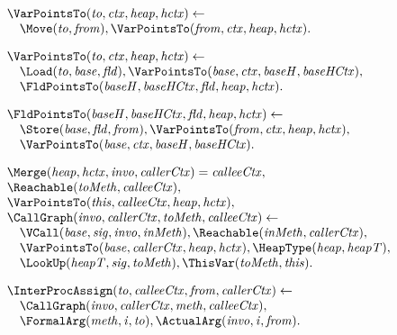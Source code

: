 {\begin{figure}[t]
\[\begin{array}{l}
  \VarPointsTo({\it to}, {\it ctx}, {\it heap}, {\it hctx}) \leftarrow \\
   \quad \Move({\it to}, {\it from}),
    \VarPointsTo({\it from}, {\it ctx},{\it heap},{\it hctx}). \\[1em]

  \VarPointsTo({\it to}, {\it ctx}, {\it heap}, {\it hctx}) \leftarrow\\
  \quad \Load({\it to}, {\it base}, {\it fld}), \VarPointsTo({\it base}, {\it ctx}, {\it baseH}, {\it baseHCtx}), \\
  \quad \FldPointsTo({\it baseH}, {\it baseHCtx}, {\it fld}, {\it heap},
   {\it hctx}). \\[1em]


  \FldPointsTo({\it baseH}, {\it baseHCtx}, {\it fld},
   {\it heap}, {\it hctx}) \leftarrow \\
  \quad \Store({\it base}, {\it fld}, {\it from}),
  \VarPointsTo({\it from}, {\it ctx}, {\it heap}, {\it hctx}), \\
    \quad \VarPointsTo({\it base}, {\it ctx}, {\it baseH}, {\it baseHCtx}).\\[1em]

  \Merge ({\it heap}, {\it hctx}, {\it invo}, {\it callerCtx}) = {\it calleeCtx}, \\
  \Reachable ({\it toMeth}, {\it calleeCtx}), \\
  \VarPointsTo ({\it this}, {\it calleeCtx}, {\it heap}, {\it hctx}), \\
  \CallGraph ({\it invo}, {\it callerCtx}, {\it toMeth}, {\it calleeCtx})
  \leftarrow \\
    \quad \VCall ({\it base}, {\it sig}, {\it invo}, {\it inMeth}), 
     \Reachable ({\it inMeth}, {\it callerCtx}), \\
   \quad \VarPointsTo ({\it base}, {\it callerCtx}, {\it heap}, {\it hctx}), 
  \HeapType({\it heap}, {\it heapT}), \\
  \quad \LookUp ({\it heapT}, {\it sig}, {\it toMeth}),
  \ThisVar ({\it toMeth}, {\it this}).\\[1em]

  \InterProcAssign({\it to}, {\it calleeCtx}, {\it from}, {\it callerCtx}) \leftarrow\\
  \quad \CallGraph({\it invo}, {\it callerCtx}, {\it meth}, {\it calleeCtx}), \\
  \quad \FormalArg({\it meth}, {\it i}, {\it to}),
  \ActualArg({\it invo}, {\it i}, {\it from}).\\[1em]
  

\end{array}\]
\end{figure}}
